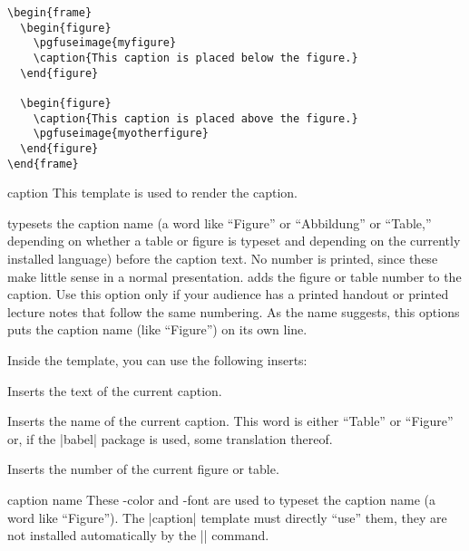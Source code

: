 \example
\begin{verbatim}
\begin{frame}
  \begin{figure}
    \pgfuseimage{myfigure}
    \caption{This caption is placed below the figure.}
  \end{figure}

  \begin{figure}
    \caption{This caption is placed above the figure.}
    \pgfuseimage{myotherfigure}
  \end{figure}
\end{frame}
\end{verbatim}

\begin{element}{caption}\yes\yes\yes
  This template is used to render the caption.
  \begin{templateoptions}
    typesets the caption name (a word like ``Figure'' or ``Abbildung'' or ``Table,'' depending on whether a table or figure is typeset and depending on the currently installed language) before the caption text. No number is printed, since these make little sense in a normal presentation.
    adds the figure or table number to the caption. Use this option only if your audience has a printed handout or printed lecture notes that follow the same numbering.
    As the name suggests, this options puts the caption name (like ``Figure'') on its own line.
  \end{templateoptions}

  Inside the template, you can use the following inserts:
  \begin{itemize}
    \iteminsert{\insertcaption}
    Inserts the text of the current caption.

    \iteminsert{\insertcaptionname}
    Inserts the name of the current caption. This word is either ``Table'' or ``Figure'' or, if the |babel| package is used, some translation thereof.

    \iteminsert{\insertcaptionnumber}
    Inserts the number of the current figure or table.
  \end{itemize}
\end{element}

\begin{element}{caption name}\no\yes\yes
  These \beamer-color and -font are used to typeset the caption name (a word like ``Figure''). The |caption| template must directly ``use'' them, they are not installed automatically by the |\insertcaptionname| command.
\end{element}

